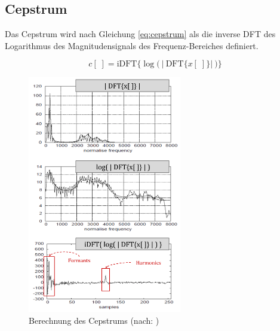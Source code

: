 \subsection{Cepstrum}

Das Cepstrum wird nach Gleichung \ref{eq:cepstrum} als die inverse DFT des Logarithmus des Magnitudensignals des Frequenz-Bereiches definiert. 

\begin{equation}
c[\;] =  \text{iDFT}\Big\{ \log \Big(\ \big|\ \text{DFT}\{x[\;]\} \big|\ \Big) \Big\}
\label{eq:cepstrum}
\end{equation}

\begin{figure}[h]
	\centering
	\includegraphics[width=0.6\textwidth]{bilder/cepstrum04.png}
	\caption{Berechnung des Cepstrums (nach: \cite[Cepstral Analysis, S. 3]{ricardo_ceps})}
	\label{img:cepstrumOverview}
\end{figure}	


